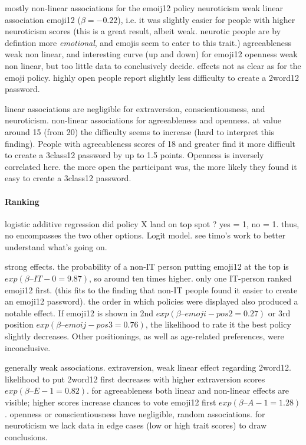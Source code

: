 mostly non-linear associations for the emoij12 policy
neuroticism weak linear association emoji12 ($\beta=-0.22$), i.e. it was slightly easier for people with higher neuroticism scores (this is a great result, albeit weak. neurotic people are by defintion more \textit{emotional}, and emojis seem to cater to this trait.)
agreeableness weak non linear, and interesting curve (up and down) for emoji12
openness weak non linear, but too little data to conclusively decide. 
effects not as clear as for the emoji policy. highly open people report slightly less difficulty to create a 2word12 password.

linear associations are negligible for extraversion, conscientiousness, and neuroticism. 
non-linear associations for agreeableness and openness. at value around 15 (from 20) the difficulty seems to increase (hard to interpret this finding). People with agreeableness scores of 18 and greater find it more difficult to create a 3class12 password by up to 1.5 points. Openness is inversely correlated here. the more open the participant was, the more likely they found it easy to create a 3class12 password. 


\paragraph{Ranking}
logistic additive regression %
did policy X land on top spot ? yes = 1, no = 1. thus, no encompasses the two other options.
Logit model. see timo's work to better understand what's going on. 



strong effects. the probability of a non-IT person putting emoji12 at the top is $exp(\beta–{IT-0}=9.87)$, so around ten times higher. only one IT-person ranked emoji12 first. (this fits to the finding that non-IT people found it easier to create an emoji12 password).
the order in which policies were displayed also produced a notable effect. If emoji12 is shown in 2nd $exp(\beta–{emoji-pos2}=0.27)$ or 3rd position $exp(\beta–{emoij-pos3}=0.76)$, the likelihood to rate it the best policy slightly decreases. Other positionings, as well as age-related preferences, were inconclusive.

generally weak associations.
extraversion, weak linear effect regarding 2word12. likelihood to put 2word12 first decreases with higher extraversion scores $exp(\beta–{E-1}=0.82)$. for agreeableness both linear and non-linear effects are visible; higher scores increase chances to vote emoji12 first $exp(\beta–{A-1}=1.28)$. openness or conscientiousness have negligible, random associations. for neuroticism we lack data in edge cases (low or high trait scores) to draw conclusions. %


